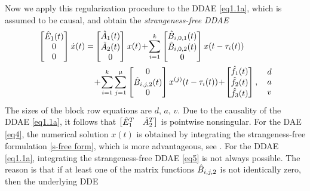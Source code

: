 \documentclass[final,reqno]{siamltex}
\begin{document}
Now we apply this regularization procedure to the DDAE \eqref{eq1.1a}, which is assumed to be causal, and obtain the \emph{strangeness-free DDAE}
%
%
\begin{equation}\label{eq5}
\begin{aligned}
 \m{\hE_{1}(t) \\ 0 \\ 0} \dot{x}(t) =&
\m{\hA_{1}(t) \\ \hA_{2}(t) \\ 0} x(t) \!+\!
\sum_{i=1}^k \m{\hB_{i,0,1}(t) \\ \hB_{i,0,2}(t) \\ 0} x(t-\tau_i(t))\\&
 \!+\!  \sum_{i=1}^k\sum_{j=1}^{\mu} \m{0 \\ \hB_{i,j,2}(t) \\ 0} x^{(j)}(t-\tau_i(t))
 \!+\! \m{\hf_{1}(t) \\ \hf_{2}(t) \\ \hf_{3}(t)}, \quad \pm{d \\ a \\ v}
\end{aligned}
\end{equation}
The sizes of the block row equations are $d$, $a$, $v$. Due to the causality of the DDAE \eqref{eq1.1a}, it follows that $\begin{bmatrix} \hat{E}^T_1 & \hat{A}^T_2 \end{bmatrix}$ is pointwise 
nonsingular.
For the DAE \eqref{eq4}, the numerical solution $x(t)$ is obtained by integrating the strangeness-free formulation \eqref{s-free form}, which is more 
advantageous, see \cite{KunM96a,KunM96c,KunM06}.
For the DDAE \eqref{eq1.1a}, integrating the strangeness-free DDAE \eqref{eq5} is not always possible. The reason is that if 
at least one of the matrix functions $\hat{B}_{i,j,2}$ is not identically zero, then the underlying DDE 
\end{document}
